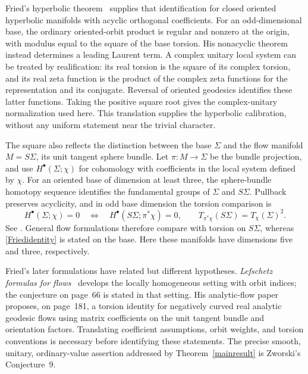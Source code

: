 \documentclass[11pt,letterpaper,reqno]{amsart}
\theoremstyle{remark}
\begin{document}
Fried's hyperbolic theorem~\cite{Fried} supplies that identification for
closed oriented hyperbolic manifolds with acyclic orthogonal
coefficients. For an odd-dimensional base, the ordinary oriented-orbit
product is regular and nonzero at the origin, with modulus equal to
the square of the base torsion. His nonacyclic theorem instead
determines a leading Laurent term. A complex unitary local system can
be treated by realification: its real torsion is the square of its
complex torsion, and its real zeta function is the product of the
complex zeta functions for the representation and its conjugate.
Reversal of oriented geodesics identifies these latter functions.
Taking the positive square root gives the complex-unitary
normalization used here. This translation supplies the hyperbolic
calibration, without any uniform statement near the trivial character.

The square also reflects the distinction between the base $\Sigma$ and
the flow manifold $M=S\Sigma$, its unit tangent sphere bundle. Let
$\pi:M\to\Sigma$ be the bundle projection, and use
$H^\bullet(\Sigma;\chi)$ for cohomology with coefficients in the local
system defined by $\chi$. For an oriented base of dimension at least three, the
sphere-bundle homotopy sequence identifies the fundamental groups of
$\Sigma$ and $S\Sigma$. Pullback preserves acyclicity, and in odd base
dimension the torsion comparison is
\begin{equation}\label{lit:sphere-torsion}
 H^\bullet(\Sigma;\chi)=0
   \quad\Longleftrightarrow\quad
 H^\bullet(S\Sigma;\pi^*\chi)=0,
 \qquad
 T_{\pi^*\chi}(S\Sigma)=T_\chi(\Sigma)^2.
\end{equation}
See \cite[Propositions 5.1--5.2]{ShenSurvey}. General flow formulations
therefore compare with torsion on $S\Sigma$, whereas
\eqref{Friedidentity} is stated on the base. Here these manifolds have
dimensions five and three, respectively.

Fried's later formulations have related but different hypotheses.
\emph{Lefschetz formulas for flows}~\cite{Fried87} develops the locally
homogeneous setting with orbit indices; the conjecture on page~66 is
stated in that setting. His analytic-flow paper~\cite{Fried95} proposes,
on page~181, a torsion identity for negatively curved real analytic
geodesic flows using matrix coefficients on the unit tangent bundle
and orientation factors. Translating coefficient assumptions, orbit
weights, and torsion conventions is necessary before identifying
these statements. The precise smooth, unitary, ordinary-value assertion
addressed by Theorem~\ref{mainresult} is Zworski's Conjecture~9.
\end{document}
